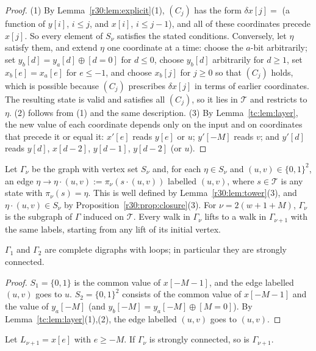 \begin{proof}
(1) By Lemma~\ref{r30:lem:explicit}(1), $(C_j)$ has the form $\delta x[j]=$ (a function of $y[i]$, $i\le j$, and $x[i]$, $i\le j-1$), and all of these coordinates precede $x[j]$. So every element of $S_\nu$ satisfies the stated conditions. Conversely, let $\eta$ satisfy them, and extend $\eta$ one coordinate at a time: choose the $a$-bit arbitrarily; set $y_b[d]=y_a[d]\oplus[d=0]$ for $d\le0$, choose $y_b[d]$ arbitrarily for $d\ge1$, set $x_b[e]=x_a[e]$ for $e\le-1$, and choose $x_b[j]$ for $j\ge0$ so that $(C_j)$ holds, which is possible because $(C_j)$ prescribes $\delta x[j]$ in terms of earlier coordinates. The resulting state is valid and satisfies all $(C_j)$, so it lies in $\mathcal{T}$ and restricts to $\eta$.
(2) follows from (1) and the same description.
(3) By Lemma~\ref{tc:lem:layer}, the new value of each coordinate depends only on the input and on coordinates that precede it or equal it: $x'[e]$ reads $y[e]$ or $u$; $y'[-M]$ reads $v$; and $y'[d]$ reads $y[d]$, $x[d-2]$, $y[d-1]$, $y[d-2]$ (or $u$).
\end{proof}

Let $\Gamma_\nu$ be the graph with vertex set $S_\nu$ and, for each $\eta\in S_\nu$ and $(u,v)\in\{0,1\}^2$, an edge $\eta\to\eta\cdot(u,v):=\pi_\nu(s\cdot(u,v))$ labelled $(u,v)$, where $s\in\mathcal{T}$ is any state with $\pi_\nu(s)=\eta$. This is well defined by Lemma~\ref{r30:lem:tower}(3), and $\eta\cdot(u,v)\in S_\nu$ by Proposition~\ref{r30:prop:closure}(3). For $\nu=2(w+1+M)$, $\Gamma_\nu$ is the subgraph of $\Gamma$ induced on $\mathcal{T}$. Every walk in $\Gamma_\nu$ lifts to a walk in $\Gamma_{\nu+1}$ with the same labels, starting from any lift of its initial vertex.

\begin{lemma}\label{r30:lem:base}
$\Gamma_1$ and $\Gamma_2$ are complete digraphs with loops; in particular they are strongly connected.
\end{lemma}

\begin{proof}
$S_1=\{0,1\}$ is the common value of $x[-M-1]$, and the edge labelled $(u,v)$ goes to $u$. $S_2=\{0,1\}^2$ consists of the common value of $x[-M-1]$ and the value of $y_a[-M]$ (and $y_b[-M]=y_a[-M]\oplus[M=0]$). By Lemma~\ref{tc:lem:layer}(1),(2), the edge labelled $(u,v)$ goes to $(u,v)$.
\end{proof}

\begin{lemma}\label{r30:lem:xstep}
Let $L_{\nu+1}=x[e]$ with $e\ge-M$. If $\Gamma_\nu$ is strongly connected, so is $\Gamma_{\nu+1}$.
\end{lemma}

